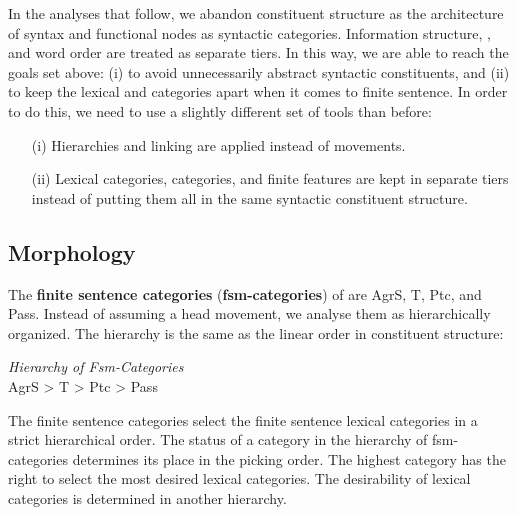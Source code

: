 \documentclass[output=paper]{langsci/langscibook}
\begin{document}
In the analyses that follow, we abandon constituent structure as the  architecture of syntax and functional nodes as syntactic categories. Information structure, , and word order are treated as separate tiers. In this way, we are able to reach the goals set above: (i) to avoid unnecessarily abstract syntactic constituents, and (ii) to keep the lexical and  categories apart when it comes to finite sentence. In order to do this, we need to use a slightly different set of tools than before: 

\begin{enumerate}
\item[(i)] Hierarchies and linking are applied instead of movements.
\item[(ii)] Lexical categories,  categories, and finite features are kept in separate tiers instead of putting them all in the same syntactic constituent structure.
\end{enumerate}
\subsection{Morphology} %

The \textbf{finite sentence  categories} (\textbf{fsm-categories}) of  are AgrS, T, Ptc, and Pass. Instead of assuming a head movement, we analyse them as hierarchically organized. The hierarchy is the same as the linear order in  constituent structure:

\ea
\textit{{Hierarchy of Fsm-Categories}}\\
{AgrS > T > Ptc > Pass}
\z

The finite sentence  categories select the finite sentence lexical categories in a strict hierarchical order. The status of a  category in the hierarchy of fsm-categories determines its place in the picking order. The highest  category has the right to select the most desired lexical categories. The desirability of lexical categories is determined in another hierarchy.
\end{document}
